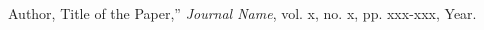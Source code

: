 \begin{thebibliography}{99}
Author, Title of the Paper,'' \emph{Journal Name}, vol. x, no. x, pp. xxx-xxx, Year.

\end{thebibliography}
